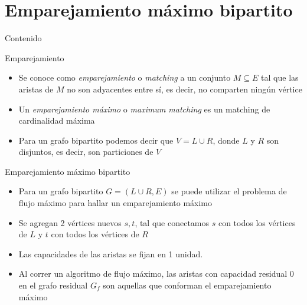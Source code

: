 \documentclass[]{beamer}
\begin{document}
\section{Emparejamiento m\'aximo bipartito}
\begin{frame}{Contenido}
\tableofcontents[currentsection]
\end{frame}

\begin{frame}{Emparejamiento}
  \begin{itemize}
    \item Se conoce como \textit{emparejamiento} o \textit{matching} a un conjunto $M \subseteq E$ tal que las aristas de $M$ no son adyacentes entre s\'i, es decir, no comparten ning\'un v\'ertice
      \pause
    \item Un \textit{emparejamiento m\'aximo} o \textit{maximum matching} es un matching de cardinalidad m\'axima
      \pause
    \item Para un grafo bipartito podemos decir que $V=L\cup R$, donde $L$ y $R$ son disjuntos, es decir, son particiones de $V$
  \end{itemize}
\end{frame}

\begin{frame}{Emparejamiento m\'aximo bipartito}
  \begin{itemize}
    \item Para un grafo bipartito $G=(L\cup R, E)$ se puede utilizar el problema de flujo m\'aximo para hallar un emparejamiento m\'aximo
      \pause
    \item Se agregan 2 v\'ertices nuevos $s, t$, tal que conectamos $s$ con todos los v\'ertices de $L$ y $t$ con todos los v\'ertices de $R$
      \pause
    \item Las capacidades de las aristas se fijan en 1 unidad.
      \pause
    \item Al correr un algoritmo de flujo m\'aximo, las aristas con capacidad residual 0 en el grafo residual $G_f$ son aquellas que conforman el emparejamiento m\'aximo
  \end{itemize}
\end{frame}
\end{document}
